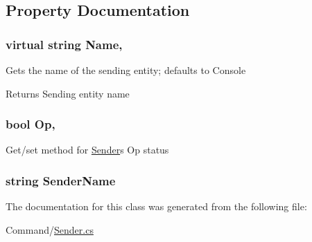 \subsection{Property Documentation}
\hypertarget{classOTA_1_1Command_1_1Sender_a5750f77ef55465dc4bf91d3f4fcbefac}{}
\subsubsection[{Name}]{\setlength{\rightskip}{0pt plus 5cm}virtual string Name\hspace{0.3cm}{\ttfamily [get]}, {}}\label{classOTA_1_1Command_1_1Sender_a5750f77ef55465dc4bf91d3f4fcbefac}


Gets the name of the sending entity; defaults to Console 

\begin{DoxyReturn}{Returns}
Sending entity name
\end{DoxyReturn}
\hypertarget{classOTA_1_1Command_1_1Sender_a21ba9f1622dc7475d067844accea3cf6}{}
\subsubsection[{Op}]{\setlength{\rightskip}{0pt plus 5cm}bool Op\hspace{0.3cm}{\ttfamily [get]}, {\ttfamily [set]}}\label{classOTA_1_1Command_1_1Sender_a21ba9f1622dc7475d067844accea3cf6}


Get/set method for \hyperlink{classOTA_1_1Command_1_1Sender}{Sender}\textquotesingle{}s Op status 

\hypertarget{classOTA_1_1Command_1_1Sender_a8435cbd7a4dda595164d4ff47d4f4525}{}
\subsubsection[{Sender\+Name}]{\setlength{\rightskip}{0pt plus 5cm}string Sender\+Name\hspace{0.3cm}{\ttfamily [get]}}\label{classOTA_1_1Command_1_1Sender_a8435cbd7a4dda595164d4ff47d4f4525}


The documentation for this class was generated from the following file\+:\begin{DoxyCompactItemize}
\item 
Command/\hyperlink{Sender_8cs}{Sender.\+cs}\end{DoxyCompactItemize}
